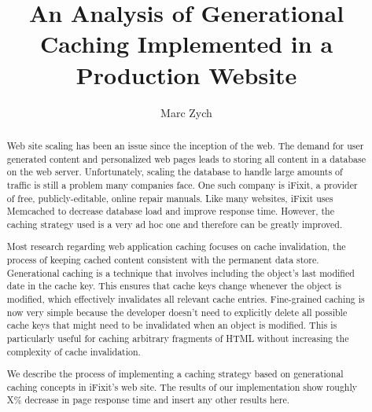 \documentclass[12pt]{ucthesis}
\begin{document}

\title{An Analysis of Generational Caching Implemented in a Production Website}
\author{Marc Zych}
  
 
     



\maketitle

\begin{frontmatter}

\copyrightpage

\committeemembershippage

\begin{abstract}
Web site scaling has been an issue since the inception of the web.
The demand for user generated content and personalized web pages leads to storing all content in a database on the web server.
Unfortunately, scaling the database to handle large amounts of traffic is still a problem many companies face.
One such company is \textsf{iFixit}, a provider of free, publicly-editable, online repair manuals.
Like many websites, \textsf{iFixit} uses \textsf{Memcached} to decrease database load and improve response time.
However, the caching strategy used is a very ad hoc one and therefore can be greatly improved.

Most research regarding web application caching focuses on cache invalidation, the process of keeping cached content consistent with the permanent data store.
Generational caching is a technique that involves including the object's last modified date in the cache key.
This ensures that cache keys change whenever the object is modified, which effectively invalidates all relevant cache entries.
Fine-grained caching is now very simple because the developer doesn't need to explicitly delete all possible cache keys that might need to be invalidated when an object is modified.
This is particularly useful for caching arbitrary fragments of HTML without increasing the complexity of cache invalidation.

We describe the process of implementing a caching strategy based on generational caching concepts in \textsf{iFixit}'s web site.
The results of our implementation show roughly X\% decrease in page response time and insert any other results here.
\end{abstract}


\tableofcontents


\listoftables

\listoffigures

\end{frontmatter}
\end{document}
